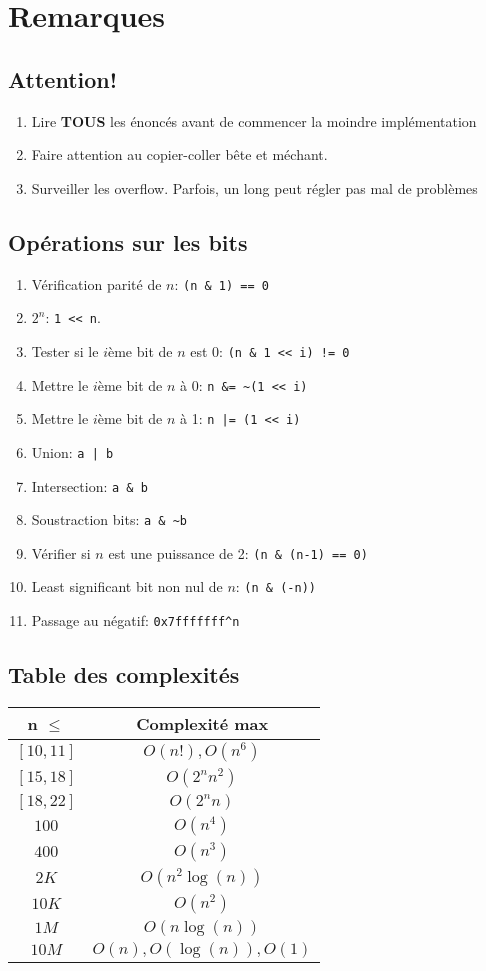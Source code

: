 \section{Remarques}
\subsection{Attention!}
\begin{enumerate}
	\item Lire \textbf{TOUS} les énoncés avant de commencer la moindre implémentation
	\item Faire attention au copier-coller bête et méchant.
	\item Surveiller les overflow. Parfois, un long peut régler pas mal de problèmes
\end{enumerate}
 
\subsection{Opérations sur les bits}
\begin{enumerate}
	\item Vérification parité de $n$: \lstinline{(n & 1) == 0}
	\item $2^n$: \lstinline|1 << n|.
	\item Tester si le $i$ème bit de $n$ est $0$: \lstinline{(n & 1 << i) != 0}
	\item Mettre le $i$ème bit de $n$ à 0: \lstinline{n &= ~(1 << i)}
	\item Mettre le $i$ème bit de $n$ à 1: \lstinline{n |= (1 << i)}
	\item Union: \lstinline{a | b}
	\item Intersection: \lstinline{a & b}
	\item Soustraction bits: \lstinline{a & ~b}
	\item Vérifier si $n$ est une puissance de 2: \lstinline{(n & (n-1) == 0)}
	\item Least significant bit non nul de $n$: \lstinline{(n & (-n))}
	\item Passage au négatif: \lstinline{0x7fffffff^n}
\end{enumerate}

\subsection{Table des complexités}
\begin{center}
\begin{tabular}{|c|c|}
\hline
n $\leq$ & Complexité max\\
\hline
$[10,11]$ & $O(n!),O(n^6)$ \\
$[15,18]$ & $O(2^n n^2)$\\
$[18,22]$ & $O(2^n n)$\\
$100$ & $O(n^4)$\\
$400$ & $O(n^3)$\\
$2K$ & $O(n^2\log(n))$\\
$10K$ & $O(n^2)$\\
$1M$ & $O(n\log(n))$\\
$10M$ & $O(n),O(\log(n)),O(1)$\\
\hline
\end{tabular}
\end{center}